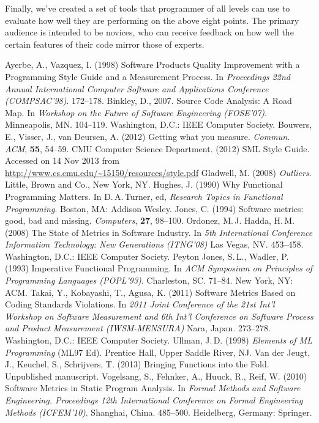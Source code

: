 \documentclass[12pt,abstracton]{scrartcl}
\begin{document}
Finally, we've created a set of tools that programmer of all levels
can use to evaluate how well they are performing on the above
eight points. The primary audience is intended to be novices,
who can receive feedback on how well the certain features
of their code mirror those of experts.
\begin{thebibliography}{99}
 Ayerbe, A., Vazquez, I. (1998) Software Products Quality Improvement with a Programming Style Guide and a Measurement Process. In \emph{Proceedings 22nd Annual International Computer Software and Applications Conference (COMPSAC'98)}. 172--178.
 Binkley, D., 2007. Source Code Analysis: A Road Map. In \emph{Workshop on the Future of Software Engineering (FOSE'07)}. Minneapolis, MN. 104--119. Washington, D.C.: IEEE Computer Society.
 Bouwers, E., Visser, J., van Deursen, A. (2012) Getting what you measure. \emph{Commun. ACM}, \textbf{55}, 54--59.
 CMU Computer Science Department. (2012) SML Style Guide. Accessed on 14 Nov 2013 from \url{http://www.cs.cmu.edu/~15150/resources/style.pdf}
 Gladwell, M. (2008) \emph{Outliers}. Little, Brown and Co., New York, NY.
 Hughes, J. (1990) Why Functional Programming Matters. In D.\,A.\,Turner, ed, \emph{Research Topics in Functional Programming}. Boston, MA: Addison Wesley.
 Jones, C. (1994) Software metrics: good, bad and missing. \emph{Computers}, \textbf{27}, 98--100.
 Ordonez, M.\,J. Hadda, H.\,M. (2008) The State of Metrics in Software Industry. In \emph{5th International Conference Information Technology: New Generations (ITNG'08)} Las Vegas, NV. 453--458. Washington, D.C.: IEEE Computer Society.
 Peyton Jones, S.\,L., Wadler, P. (1993) Imperative Functional Programming. In \emph{ACM Symposium on Principles of Programming Languages (POPL'93)}. Charleston, SC. 71--84. New York, NY: ACM.
 Takai, Y., Kobayashi, T., Agusa, K. (2011) Software Metrics Based on Coding Standards Violations. In \emph{2011 Joint Conference of the 21st Int'l Workshop on Software Measurement and 6th Int'l Conference on Software Process and Product Measurement (IWSM-MENSURA)} Nara, Japan. 273--278. Washington, D.C.: IEEE Computer Society.
 Ullman, J.\,D. (1998) \emph{Elements of ML Programming} (ML97 Ed). Prentice Hall, Upper Saddle River, NJ.
 Van der Jeugt, J., Keuchel, S., Schrijvers, T. (2013) Bringing Functions into the Fold. Unpublished manuscript.
 Vogelsang, S., Fehnker, A., Huuck, R., Reif, W. (2010) Software Metrics in Static Program Analysis. In \emph{Formal Methods and Software Engineering. Proceedings 12th International Conference on Formal Engineering Methods (ICFEM'10)}. Shanghai, China. 485--500. Heidelberg, Germany: Springer.
\end{thebibliography}
\end{document}
